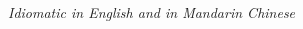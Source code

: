 \documentclass[10pt,a4paper,ragged2e,withhyper]{altacv}
\begin{document}
\begin{paracol}{2}


\bigskip

\textit{Idiomatic in English and in Mandarin Chinese}

















\end{paracol}
\end{document}
